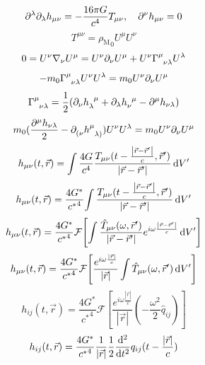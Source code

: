 \begin{equation}
    \partial^{\lambda}\partial_{\lambda}h_{\mu\nu}=-\frac{16\pi G}{c^4}T_{\mu \nu},\quad\partial^{\nu}h_{\mu\nu}=0
\end{equation}
\begin{equation}
    T^{\mu\nu}={\rho_\text{M}}_0U^\mu U^\nu
\end{equation}
\begin{equation}
    0=U^\nu\nabla_\nu U^\mu=U^\nu\p_\nu U^\mu+U^\nu\Gamma^{\mu}_{\ph{\mu}\nu\lambda}U^\lambda
\end{equation}
\begin{equation}
    -m_0\Gamma^{\mu}_{\ph{\mu}\nu\lambda}U^\nu U^\lambda=m_0U^\nu\p_\nu U^\mu
\end{equation}
\begin{equation}
    \Gamma^{\mu}_{\ph{\mu}\nu\lambda}=\frac{1}{2}(\p_{\nu}h_{\lambda}^{\ph{\lambda}\mu}+\p_{\lambda}h_{\nu}^{\ph{\nu}\mu}-\p^{\mu}h_{\nu\lambda})
\end{equation}
\begin{equation}
    m_0(\frac{\p^{\mu}h_{\nu\lambda}}{2}-\p_{(\nu}^{\text{}}h^{\mu}_{\ph{\mu}\lambda)})U^\nu U^\lambda=m_0U^\nu\p_\nu U^\mu
\end{equation}
\begin{equation}
    h_{\mu\nu}(t,\vec{r})=\int\frac{4G}{c^4}\frac{T_{\mu\nu}(t-\frac{\left\lvert\vec{r}-\vec{r}'\right\rvert}{c},\vec{r}')}{\left\lvert\vec{r}-\vec{r}'\right\rvert}\,\mathrm{d} V'
\end{equation}
\begin{equation}
    h_{\mu\nu}(t,\vec{r})=\frac{4G^*}{{c^*}^4}\!\int\frac{T_{\mu\nu}(t-\frac{\left\lvert\vec{r}-\vec{r}'\right\rvert}{c},\vec{r}')}{\left\lvert\vec{r}-\vec{r}'\right\rvert}\,\mathrm{d} V'
\end{equation}
\begin{equation}
    h_{\mu\nu}(t,\vec{r})=\frac{4G^*}{{c^*}^4}\mathcal{F}\!\left[\int 
    \frac{\hat{T}_{\mu\nu}(\omega,\vec{r}')}{\left\lvert\vec{r}-\vec{r}'\right\rvert}e^{i\omega\frac{\left\lvert\vec{r}-\vec{r}'\right\rvert}{c}}\,\mathrm{d} V'\right]
\end{equation}
\begin{equation}
    h_{\mu\nu}(t,\vec{r})=\frac{4G^*}{{c^*}^4}\mathcal{F}\!\left[\frac{e^{i\omega\frac{\left\lvert\vec{r}\right\rvert}{c}}}{\left\lvert\vec{r}\right\rvert}\int\hat{T}_{\mu\nu}(\omega,\vec{r}')\,\mathrm{d} V'\right]
\end{equation}
\begin{equation}
    h_{ij}(t,\vec{r})=\frac{4G^*}{{c^*}^4}\mathcal{F}\!\left[\frac{e^{i\omega\frac{\left\lvert\vec{r}\right\rvert}{c}}}{\left\lvert\vec{r}\right\rvert}(-\frac{\omega^2}{2}\hat{q}_{ij})\right]
\end{equation}
\begin{equation}
    {h}_{ij}(t,\vec{r})=\frac{4G^*}{{c^*}^4}\frac{1}{\left\lvert\vec{r}\right\rvert}\frac{1}{2}\frac{\mathrm{d}^2}{\mathrm{d} t^2}q_{ij}(t-\frac{\left\lvert\vec{r}\right\rvert}{c})
\end{equation}
